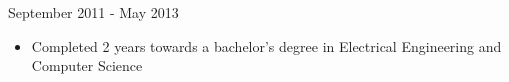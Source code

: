 \documentclass{resume}
\begin{document}
\begin{spacing}{1.2}
\begin{paracol}{2}
		\bigskip
		\bigskip

		\small {}

		{\large{}}
		\hfill{\color{subcontent} September 2011 - May 2013}

		\nointerlineskip
		\begin{itemize}
			\item Completed 2 years towards a bachelor's degree in Electrical Engineering and Computer Science
		\end{itemize}
	\end{paracol}
\end{spacing}
\end{document}
